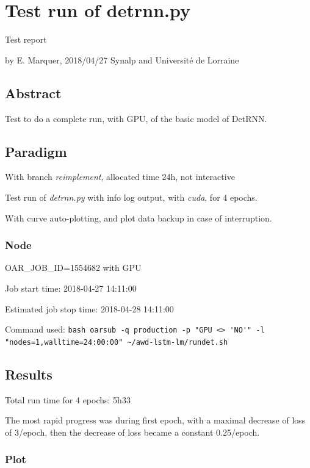 \section*{Test run of detrnn.py}

Test report

by E. Marquer, 2018/04/27 Synalp and Université de Lorraine

\subsection{Abstract}

Test to do a complete run, with GPU, of the basic model of DetRNN.

\subsection{Paradigm}

With branch \emph{reimplement}, allocated time 24h, not interactive

Test run of \emph{detrnn.py} with info log output, with \emph{cuda}, for
4 epochs.

With curve auto-plotting, and plot data backup in case of interruption.

\subsubsection{Node}

OAR\_JOB\_ID=1554682 with GPU

Job start time: 2018-04-27 14:11:00

Estimated job stop time: 2018-04-28 14:11:00

Command used:
\lstinline!bash oarsub -q production -p "GPU <> 'NO'" -l "nodes=1,walltime=24:00:00" ~/awd-lstm-lm/rundet.sh!

\subsection{Results}

Total run time for 4 epochs: 5h33

The most rapid progress was during first epoch, with a maximal decrease
of loss of 3/epoch, then the decrease of loss became a constant
0.25/epoch.

\newpage
\subsubsection{Plot}

